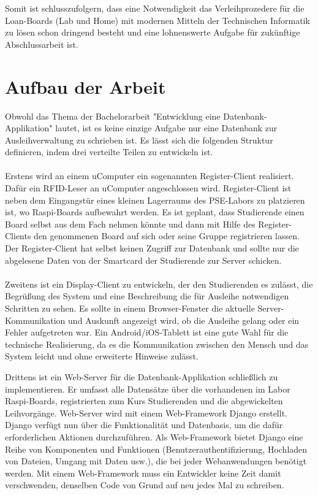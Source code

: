 Somit ist schlusszufolgern, dass eine Notwendigkeit das Verleihprozedere für die Loan-Boards (Lab und Home) mit modernen Mitteln der Technischen Informatik zu lösen schon dringend besteht und eine lohnenswerte Aufgabe für zukünftige Abschlussarbeit ist. 

\section{Aufbau der Arbeit}
\label{sec:intro:themengebiet}
Obwohl das Thema der Bachelorarbeit "Entwicklung eine Datenbank-Applikation" lautet, ist es keine einzige Aufgabe nur eine Datenbank zur Ausleihverwaltung zu schrieben ist. Es lässt sich die folgenden Struktur definieren, indem drei verteilte Teilen zu entwickeln ist.\\\\
Erstens wird an einem uComputer ein sogenannten Register-Client realisiert. Dafür ein RFID-Leser an uComputer angeschlossen wird. Register-Client ist neben dem Eingangstür eines kleinen Lagerraums des PSE-Labors zu platzieren ist, wo Raspi-Boards aufbewahrt werden. Es ist geplant, dass Studierende einen Board selbst aus dem Fach nehmen könnte und dann mit Hilfe des Register-Clients den genommenen Board auf sich oder seine Gruppe registrieren lassen. Der Register-Client hat selbst keinen Zugriff zur Datenbank und sollte nur die abgelesene Daten von der Smartcard der Studierende zur Server schicken. \\\\
Zweitens ist ein Display-Client zu entwickeln, der den Studierenden es zulässt, die Begrüßung des System und eine Beschreibung die für Ausleihe notwendigen Schritten zu sehen. Es sollte in einem Browser-Fenster die aktuelle Server-Kommunikation und Auskunft angezeigt wird, ob die Ausleihe gelang oder ein Fehler aufgetreten war. Ein Android/iOS-Tablett ist eine gute Wahl für die technische Realisierung, da es die Kommunikation zwischen den Mensch und das System leicht und ohne erweiterte Hinweise zulässt. 

Drittens ist ein Web-Server für die Datenbank-Applikation schließlich zu implementieren. Er umfasst alle Datensätze über die vorhandenen im Labor Raspi-Boards, registrierten zum Kurs Studierenden und die abgewickelten Leihvorgänge.  Web-Server wird mit einem Web-Framework Django erstellt. Django verfügt nun über die Funktionalität und Datenbasis, um die dafür erforderlichen Aktionen durchzuführen. Als Web-Framework bietet Django eine Reihe von Komponenten und Funktionen (Benutzerauthentifizierung, Hochladen von Dateien, Umgang mit Daten usw.), die bei jeder Webanwendungen benötigt werden. Mit einem Web-Framework muss ein Entwickler keine Zeit damit verschwenden, denselben Code von Grund auf neu jedes Mal zu schreiben.

